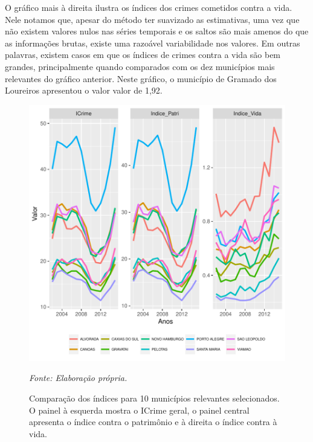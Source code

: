 \documentclass[12pt,openright,oneside,a4paper,english,french,spanish]{abntex2}
\numberwithin{table}{section} %
\numberwithin{figure}{section} %
\newcommand{\source}[1]{\textit{#1}}
\begin{document}
O gráfico mais à direita ilustra os índices dos crimes cometidos contra a vida. Nele notamos que, apesar do método ter suavizado as estimativas, uma vez que não existem valores nulos nas séries temporais e os saltos são mais amenos do que as informações brutas, existe uma razoável variabilidade nos valores. Em outras palavras, existem casos em que os índices de crimes contra a vida são bem grandes, principalmente quando comparados com os dez municípios mais relevantes do gráfico anterior. Neste gráfico, o município de Gramado dos Loureiros apresentou o valor valor de 1,92.

\begin{figure}
\begin{center}
\includegraphics{TESE_DE_DOUTORADO_RENAN_FINAL-plot10}
\end{center}
\caption{Comparação dos índices para 10 municípios relevantes selecionados. O painel à esquerda mostra o ICrime geral, o painel central apresenta o índice contra o patrimônio e à direita o índice contra à vida.}
\source{Fonte: Elaboração própria.}
\label{fig:indices_top10}
\end{figure}
\end{document}
